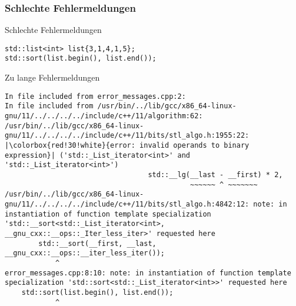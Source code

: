 \subsubsection{Schlechte Fehlermeldungen}

\begin{frame}[fragile]{Schlechte Fehlermeldungen}

    \begin{verbatim}
std::list<int> list{3,1,4,1,5};
std::sort(list.begin(), list.end());
    \end{verbatim}
\end{frame}

\setlength{\fboxsep}{0.1pt}
\begin{frame}{Zu lange Fehlermeldungen}
    \begin{verbatim}
In file included from error_messages.cpp:2:
In file included from /usr/bin/../lib/gcc/x86_64-linux-gnu/11/../../../../include/c++/11/algorithm:62:
/usr/bin/../lib/gcc/x86_64-linux-gnu/11/../../../../include/c++/11/bits/stl_algo.h:1955:22:
|\colorbox{red!30!white}{error: invalid operands to binary expression}| ('std::_List_iterator<int>' and 'std::_List_iterator<int>')
                                  std::__lg(__last - __first) * 2,
                                            ~~~~~~ ^ ~~~~~~~
/usr/bin/../lib/gcc/x86_64-linux-gnu/11/../../../../include/c++/11/bits/stl_algo.h:4842:12: note: in instantiation of function template specialization 'std::__sort<std::_List_iterator<int>, __gnu_cxx::__ops::_Iter_less_iter>' requested here
        std::__sort(__first, __last, __gnu_cxx::__ops::__iter_less_iter());
            ^
error_messages.cpp:8:10: note: in instantiation of function template specialization 'std::sort<std::_List_iterator<int>>' requested here
    std::sort(list.begin(), list.end());
            ^


\end{verbatim}
\end{frame}
